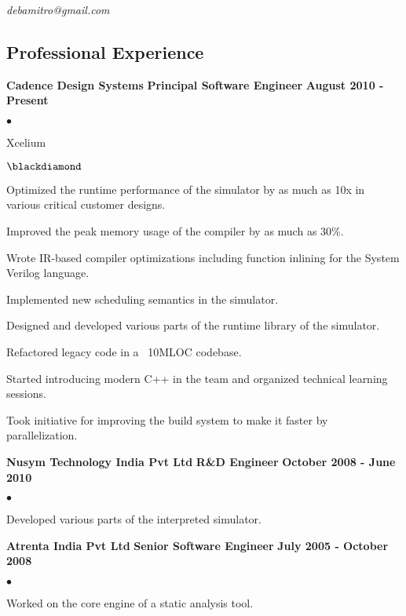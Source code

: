 \documentclass[margin,line]{res}
\newenvironment{list1}{
  \begin{list}{$\bullet$}{%
      \setlength{\itemsep}{0in}
      \setlength{\parsep}{0in} \setlength{\parskip}{0in}
      \setlength{\topsep}{0in} \setlength{\partopsep}{0in}
      \setlength{\leftmargin}{0.17in}}}{\end{list}}
\newenvironment{list2}{
  \begin{list}{$\blackdiamond$}{%
      \setlength{\itemsep}{0in}
      \setlength{\parsep}{0in} \setlength{\parskip}{0in}
      \setlength{\topsep}{0in} \setlength{\partopsep}{0in}
      \setlength{\leftmargin}{0.2in}}}{\end{list}}
\begin{document}
 \hfill {\em debamitro@gmail.com}

\begin{resume}

\section{\sc Professional Experience}
{\bf   Cadence Design Systems}
\hfill {\bf Principal Software Engineer}
\hfill{\bf August 2010 - Present}
\vspace{.05in}
\begin{list1} %
	\item Xcelium
	\begin{list2}
		\item Optimized the runtime performance of the simulator by as much as 10x in various critical customer designs.
		\item Improved the peak memory usage of the compiler by as much as 30\%.
		\item Wrote IR-based compiler optimizations including function inlining for the System Verilog language.
		\item Implemented new scheduling semantics in the simulator.
		\item Designed and developed various parts of the runtime library of the simulator.
		\item Refactored legacy code in a ~10MLOC codebase.
   		\item Started introducing modern C++ in the team and organized technical learning sessions.
   		\item Took initiative for improving the build system to make it faster by parallelization.
	\end{list2}
\end{list1}

{\bf  Nusym Technology India Pvt Ltd}
\hfill {\bf R\&D Engineer}
\hfill{\bf October 2008 - June 2010}
\vspace{.05in}
\begin{list1} %
	\item Developed various parts of the interpreted simulator.
\end{list1}
{\bf  Atrenta India Pvt Ltd}
\hfill {\bf Senior Software Engineer}
\hfill{\bf July 2005 - October 2008}
\vspace{.05in}
\begin{list1} %
\item Worked on the core engine of a static analysis tool.
\end{list1}


\end{resume}
\end{document}
